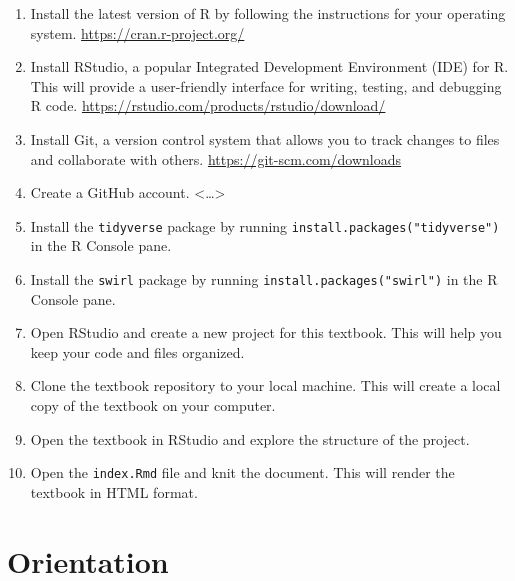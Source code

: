 \documentclass[
  letterpaper,
]{scrbook}
\providecommand{\tightlist}{%
  \setlength{\itemsep}{0pt}\setlength{\parskip}{0pt}}\usepackage{longtable,booktabs,array}
\begin{document}
\begin{tcolorbox}[enhanced jigsaw, title=\textcolor{quarto-callout-note-color}{\faInfo}\hspace{0.5em}{Technical exercises}, titlerule=0mm, toptitle=1mm, colbacktitle=quarto-callout-note-color!10!white, bottomtitle=1mm, left=2mm, colframe=quarto-callout-note-color-frame, breakable, toprule=.15mm, colback=white, opacitybacktitle=0.6, leftrule=.75mm, rightrule=.15mm, bottomrule=.15mm, arc=.35mm, coltitle=black, opacityback=0]

\begin{enumerate}
\def\labelenumi{\arabic{enumi}.}
\tightlist
\item
  Install the latest version of R by following the instructions for your
  operating system. \url{https://cran.r-project.org/}
\item
  Install RStudio, a popular Integrated Development Environment (IDE)
  for R. This will provide a user-friendly interface for writing,
  testing, and debugging R code.
  \url{https://rstudio.com/products/rstudio/download/}
\item
  Install Git, a version control system that allows you to track changes
  to files and collaborate with others.
  \url{https://git-scm.com/downloads}
\item
  Create a GitHub account. \textless\ldots\textgreater{}
\item
  Install the \texttt{tidyverse} package by running
  \texttt{install.packages("tidyverse")} in the R Console pane.
\item
  Install the \texttt{swirl} package by running
  \texttt{install.packages("swirl")} in the R Console pane.
\item
  Open RStudio and create a new project for this textbook. This will
  help you keep your code and files organized.
\item
  Clone the textbook repository to your local machine. This will create
  a local copy of the textbook on your computer.
\item
  Open the textbook in RStudio and explore the structure of the project.
\item
  Open the \texttt{index.Rmd} file and knit the document. This will
  render the textbook in HTML format.
\end{enumerate}

\end{tcolorbox}

\part{Orientation}
\end{document}
